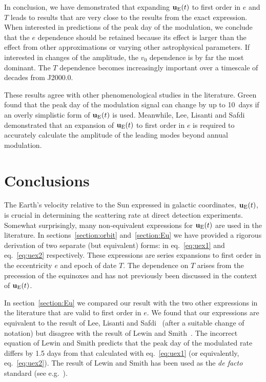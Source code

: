 \documentclass[preprintnumbers,a4paper,twocolumn,floats,nofootinbib,superscriptaddress,aps,prd]{revtex4-1}
\begin{document}
In conclusion, we have demonstrated that expanding $\mathbf{u}_{\rm{E}}(t)$ to first order in $e$ and $T$ leads to results that are very close to the results from the exact expression. When interested in predictions of the peak day of the modulation, we conclude that the $e$ dependence should be retained because its effect is larger than the effect from other approximations or varying other astrophysical parameters. If interested in changes of the amplitude, the $v_0$ dependence is by far the most dominant. The $T$ dependence becomes increasingly important over a timescale of decades from J2000.0.

These results agree with other phenomenological studies in the literature. Green~\cite{Green:2003yh} found that the peak day of the modulation signal can change by up to 10~days if an overly simplistic form of $\mathbf{u}_{\rm{E}}(t)$ is used. Meanwhile, Lee, Lisanti and Safdi~\cite{Lee:2013xxa} demonstrated that an expansion of $\mathbf{u}_{\rm{E}}(t)$ to first order in $e$ is required to accurately calculate the amplitude of the leading modes beyond annual modulation.

\section{Conclusions}
The Earth's velocity relative to the Sun expressed in galactic coordinates, $\mathbf{u}_{\rm{E}}(t)$, is crucial in determining the scattering rate at direct detection experiments. Somewhat surprisingly, many non-equivalent expressions for $\mathbf{u}_{\rm{E}}(t)$ are used in the literature. In sections~\ref{section:orbit} and~\ref{section:Eu} we have provided a rigorous derivation of two separate (but equivalent) forms: in eq.~\eqref{eq:uex1} and eq.~\eqref{eq:uex2} respectively. These expressions are series expansions to first order in the eccentricity $e$ and epoch of date $T$. The dependence on $T$ arises from the precession of the equinoxes and has not previously been discussed in the context of $\mathbf{u}_{\rm{E}}(t)$. 

In section~\ref{section:Eu} we compared our result with the two other expressions in the literature that are valid to first order in $e$. We found that our expressions are equivalent to the result of Lee, Lisanti and Safdi~\cite{Lee:2013xxa} (after a suitable change of notation) but disagree with the result of Lewin and Smith~\cite{Lewin:1995rx}. The incorrect equation of Lewin and Smith predicts that the peak day of the modulated rate differs by 1.5 days from that calculated with eq.~\eqref{eq:uex1} (or equivalently, eq.~\eqref{eq:uex2}). The result of Lewin and Smith has been used as the {\it de facto} standard (see e.g.~\cite{Green:2003yh}). 
\end{document}
